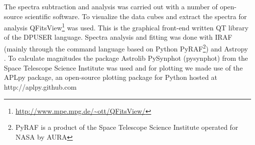 The spectra subtraction and analysis was carried out with a number of open-source scientific software. To visualize the data cubes and extract the spectra for analysis QFitsView\footnote{\url{http://www.mpe.mpg.de/~ott/QFitsView/}} was used. This is the graphical front-end written QT library of the DPUSER language. Spectra analysis and fitting was done with IRAF \citep{1986SPIE..627..733T} (mainly through the command language based on Python PyRAF\footnote{PyRAF is a product of the Space Telescope Science Institute operated for NASA by AURA}) and Astropy \citep{astropy_collaboration_2013}. To calculate magnitudes the package Astrolib PySynphot (pysynphot) from the Space Telescope Science Institute was used and for plotting we made use of the APLpy package, an open-source plotting package for Python hosted at http://aplpy.github.com

